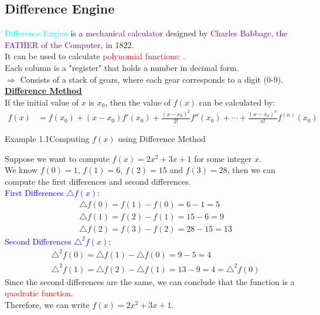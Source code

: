 \documentclass{book}
\begin{document}
\subsection{Difference Engine}
\raggedright
\textcolor{cyan}{Difference Engine} is a \textcolor{purple}{mechanical calculator} designed by \textcolor{purple}{Charles Babbage, the FATHER of the Computer}, in 1822.\\
It can be used to calculate \textcolor{red}{polynomial functions}: .\\
Each column is a "register" that holds a number in decimal form.\\
$\Rightarrow$ Consists of a stack of gears, where each gear corresponds to a digit (0-9).\\
\vspace{0.1cm}
\uline{\textbf{Difference Method}}\\
If the initial value of $x$ is $x_0$, then the value of $f(x)$ can be calculated by:
\begin{align*}
    f(x) &= f(x_0) + (x - x_0) f'(x_0) + \frac{(x - x_0)^2}{2!} f''(x_0) + \cdots + \frac{(x - x_0)^n}{n!} f^{(n)}(x_0)
\end{align*}
\begin{egBox}{Example 1.1}{Computing $f(x)$ using Difference Method}
    \raggedright
    Suppose we want to compute $f(x) = 2x^2 + 3x + 1$ for some integer $x$.\\
    We know $f(0) = 1$, $f(1) = 6$, $f(2) = 15$ and $f(3) = 28$, then we can compute the first differences and second differences.\\
    \textcolor{blue}{First Differences $\triangle f(x)$}:
    \begin{align*}
        & \triangle f(0) = f(1) - f(0) = 6 - 1 = 5\\
        & \triangle f(1) = f(2) - f(1) = 15 - 6 = 9\\
        & \triangle f(2) = f(3) - f(2) = 28 - 15 = 13
    \end{align*}
    \textcolor{blue}{Second Differences $\triangle^2 f(x)$}:\\
    \begin{align*}
        & \triangle^2 f(0) = \triangle f(1) - \triangle f(0) = 9 - 5 = 4\\
        & \triangle^2 f(1) = \triangle f(2) - \triangle f(1) = 13 - 9 = 4 = \triangle^2 f(0)
    \end{align*}
    Since the second differences are the same, we can conclude that the function is a \textcolor{red}{quadratic function}.\\
    Therefore, we can write $f(x) = 2x^2 + 3x + 1$.\\
\end{egBox}
\end{document}
